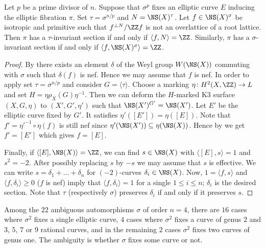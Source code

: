 \begin{lemma}\label{hassection}
 Let $p$ be a prime divisor of $n$. Suppose that $\sigma^p$ fixes an elliptic curve $E$ inducing the elliptic fibration $\pi$. Set $\tau=\sigma^{n/p}$ and $N= \NS(X)^{\tau}$.
 Let $f\in \NS(X)^\sigma$ be isotropic and primitive such that $f^{\perp N}/\ZZ f$ is not an overlattice of a root lattice.
 Then $\pi$ has a $\tau$-invariant section if and only if $\langle f, N \rangle = \ZZ$.
 Similarly, $\pi$ has a $\sigma$-invariant section if and only if $\langle f ,\NS(X)^\sigma \rangle=\ZZ$.
\end{lemma}
\begin{proof}
By \cite[Lemma 1.7 and Theorem 1.8]{oguiso-sakurai} there exists an element $\delta$ of the  Weyl group $W(\NS(X))$ commuting with $\sigma$ such that $\delta(f)$ is nef. Hence we may assume  that $f$ is nef.
In order to apply  set $\tau = \sigma^{n/p}$ and consider $G=\langle \tau \rangle$. Choose a marking $\eta\colon H^2(X,\ZZ)\to L$ and set $H= \eta\rho_X(G) \eta^{-1}$. Then we can deform the $H$-marked K3 surface $(X,G,\eta)$ to $(X',G',\eta')$ such that
$\NS(X')^{G'} = \NS(X')$. Let $E'$ be the elliptic curve fixed by $G'$. It satisfies $\eta'([E']) = \eta([E])$. Note that $f' = \eta'^{-1} \circ \eta(f)$ is still nef since $\eta'(\NS(X'))\subseteq \eta(\NS(X))$.
Hence by  we get $f'= [E']$ which gives $f = [E]$.

Finally, if $\langle [E], \NS(X)\rangle = \ZZ$, we can find $s \in \NS(X)$ with $\langle [E],s\rangle=1$ and $s^2=-2$. After possibly replacing $s$ by $-s$ we may assume that $s$ is effective.
We can write $s = \delta_1 + \dots + \delta_n$ for $(-2)$-curves $\delta_i \in \NS(X)$. Now, $1=\langle f , s \rangle$ and $\langle f, \delta_i \rangle \geq 0$ ($f$ is nef) imply that $\langle f , \delta_i \rangle =1$ for a single $1\leq i \leq n $; $\delta_i$ is the desired section. Note that $\tau$ (respectively $\sigma$) preserves $\delta_i$ if and only if it preserves $s$.
\end{proof}

Among the $22$ ambiguous automorphisms $\sigma$ of order $n=4$, there are $16$ cases where $\sigma^2$ fixes a single elliptic curve,
$4$ cases where $\sigma^2$ fixes a curve of genus $2$ and $3$, $5$, $7$ or $9$ rational curves, and in the remaining $2$ cases $\sigma^2$ fixes two curves of genus one.
The ambiguity is whether $\sigma$ fixes some curve or not.


